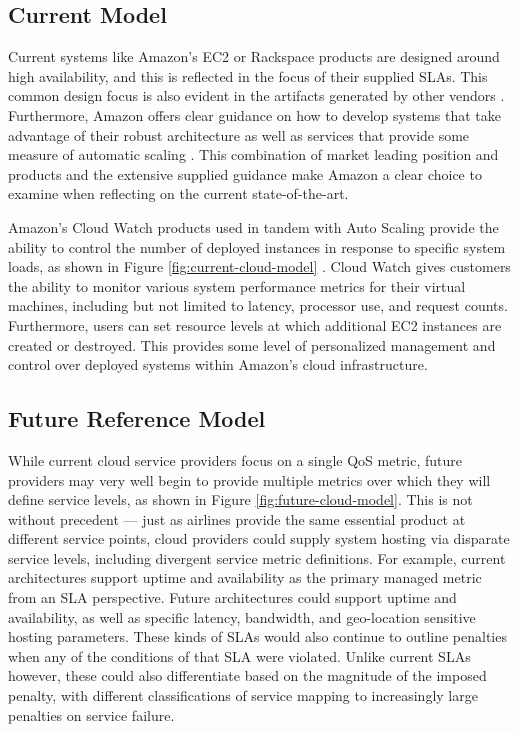 \documentclass[a4paper,twoside]{article}
\begin{document}
\subsection{Current Model}
Current systems like Amazon's EC2 or Rackspace products are designed around high availability, and this is reflected in the focus of their supplied SLAs.  This common design focus is also evident in the artifacts generated by other vendors \cite{ctrl:google-arch}.  Furthermore, Amazon offers clear guidance on how to develop systems that take advantage of their robust architecture as well as services that provide some measure of automatic scaling \cite{ctrl:amazon-best-practice,ctrl:amazon-fault-tolerant}.  This combination of market leading position and products and the extensive supplied guidance make Amazon a clear choice to examine when reflecting on the current state-of-the-art.

Amazon's Cloud Watch products used in tandem with Auto Scaling provide the ability to control the number of deployed instances in response to specific system loads, as shown in Figure \ref{fig:current-cloud-model} \cite{ctrl:amazon-cloud-watch,ctrl:amazon-auto-scale}.  Cloud Watch gives customers the ability to monitor various system performance metrics for their virtual machines, including but not limited to latency, processor use, and request counts.  Furthermore, users can set resource levels at which additional EC2 instances are created or destroyed.  This provides some level of personalized management and control over deployed systems within Amazon's cloud infrastructure.

\subsection{Future Reference Model}
While current cloud service providers focus on a single QoS metric, future providers may very well begin to provide multiple metrics over which they will define service levels, as shown in Figure \ref{fig:future-cloud-model}.  This is not without precedent --- just as airlines provide the same essential product at different service points, cloud providers could supply system hosting via disparate service levels, including divergent service metric definitions.  For example, current architectures support uptime and availability as the primary managed metric from an SLA perspective.  Future architectures could support uptime and availability, as well as specific latency, bandwidth, and geo-location sensitive hosting parameters.  These kinds of SLAs would also continue to outline penalties when any of the conditions of that SLA were violated.  Unlike current SLAs however, these could also differentiate based on the magnitude of the imposed penalty, with different classifications of service mapping to increasingly large penalties on service failure.
\end{document}
